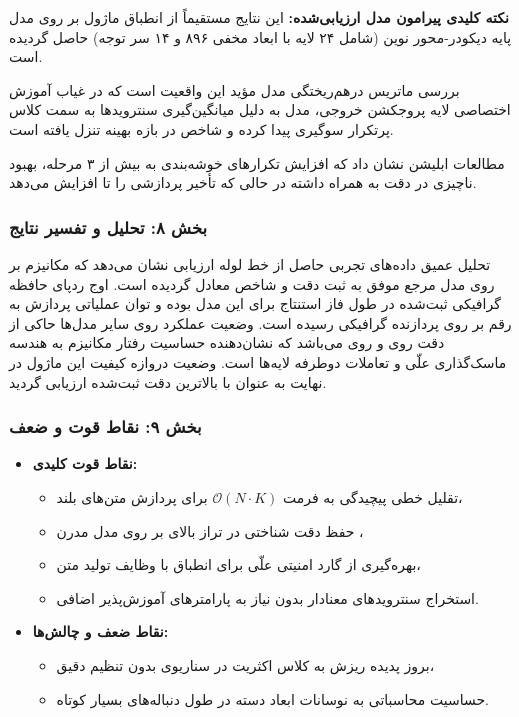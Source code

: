 \textbf{نکته کلیدی پیرامون مدل ارزیابی‌شده:} این نتایج مستقیماً از انطباق ماژول بر روی مدل پایه دیکودر-محور نوین  (شامل ۲۴ لایه با ابعاد مخفی ۸۹۶ و ۱۴ سر توجه) حاصل گردیده است.



بررسی ماتریس درهم‌ریختگی مدل مؤید این واقعیت است که در غیاب آموزش اختصاصی لایه پروجکشن خروجی، مدل به دلیل میانگین‌گیری سنترویدها به سمت کلاس پرتکرار سوگیری پیدا کرده و شاخص  در بازه بهینه تنزل یافته است.

مطالعات ابلیشن نشان داد که افزایش تکرارهای خوشه‌بندی به بیش از ۳ مرحله، بهبود ناچیزی در دقت به همراه داشته در حالی که تأخیر پردازشی را تا  افزایش می‌دهد.
\subsubsection*{بخش ۸: تحلیل و تفسیر نتایج }
تحلیل عمیق داده‌های تجربی حاصل از خط لوله ارزیابی نشان می‌دهد که مکانیزم  بر روی مدل مرجع  موفق به ثبت دقت  و شاخص  معادل  گردیده است. اوج ردپای حافظه گرافیکی ثبت‌شده در طول فاز استنتاج برای این مدل  بوده و توان عملیاتی پردازش به رقم  بر روی پردازنده گرافیکی  رسیده است. وضعیت عملکرد روی سایر مدل‌ها حاکی از دقت  روی  و  روی  می‌باشد که نشان‌دهنده حساسیت رفتار مکانیزم به هندسه ماسک‌گذاری علّی و تعاملات دوطرفه لایه‌ها است. وضعیت دروازه کیفیت این ماژول در نهایت به عنوان  با بالاترین دقت ثبت‌شده  ارزیابی گردید.

\subsubsection*{بخش ۹: نقاط قوت و ضعف }
\begin{itemize}
    \item \textbf{نقاط قوت کلیدی:}
    \begin{itemize}
        \item تقلیل خطی پیچیدگی به فرمت $\mathcal{O}(N \cdot K)$ برای پردازش متن‌های بلند،
        \item حفظ دقت شناختی در تراز بالای  بر روی مدل مدرن ،
        \item بهره‌گیری از گارد امنیتی علّی برای انطباق با وظایف تولید متن،
        \item استخراج سنترویدهای معنادار بدون نیاز به پارامترهای آموزش‌پذیر اضافی.
    \end{itemize}
    \item \textbf{نقاط ضعف و چالش‌ها:}
    \begin{itemize}
        \item بروز پدیده ریزش به کلاس اکثریت  در سناریوی بدون تنظیم دقیق،
        \item حساسیت محاسباتی به نوسانات ابعاد دسته در طول دنباله‌های بسیار کوتاه.
    \end{itemize}
\end{itemize}

